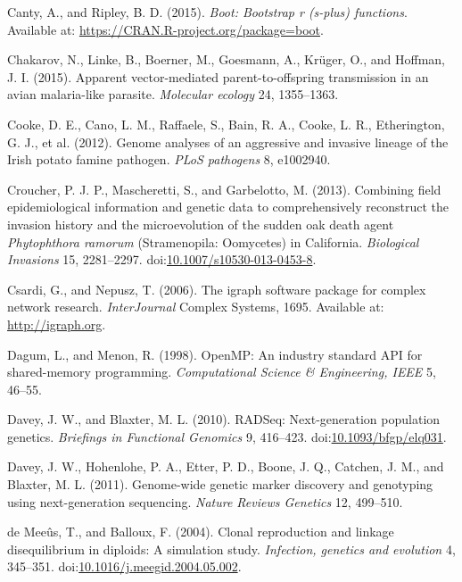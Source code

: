 \documentclass[double,12pt]{beavtex}
\begin{document}
  \hypertarget{ref-canty2015boot}{}
  Canty, A., and Ripley, B. D. (2015). \emph{Boot: Bootstrap r (s-plus)
  functions}. Available at: \url{https://CRAN.R-project.org/package=boot}.
  
  \hypertarget{ref-chakarov2015apparent}{}
  Chakarov, N., Linke, B., Boerner, M., Goesmann, A., Krüger, O., and
  Hoffman, J. I. (2015). Apparent vector-mediated parent-to-offspring
  transmission in an avian malaria-like parasite. \emph{Molecular ecology}
  24, 1355--1363.
  
  \hypertarget{ref-cooke2012genome}{}
  Cooke, D. E., Cano, L. M., Raffaele, S., Bain, R. A., Cooke, L. R.,
  Etherington, G. J., et al. (2012). Genome analyses of an aggressive and
  invasive lineage of the Irish potato famine pathogen. \emph{PLoS
  pathogens} 8, e1002940.
  
  \hypertarget{ref-croucher2013combining}{}
  Croucher, P. J. P., Mascheretti, S., and Garbelotto, M. (2013).
  Combining field epidemiological information and genetic data to
  comprehensively reconstruct the invasion history and the microevolution
  of the sudden oak death agent \emph{Phytophthora ramorum} (Stramenopila:
  Oomycetes) in California. \emph{Biological Invasions} 15, 2281--2297.
  doi:\href{https://doi.org/10.1007/s10530-013-0453-8}{10.1007/s10530-013-0453-8}.
  
  \hypertarget{ref-csardi2006igraph}{}
  Csardi, G., and Nepusz, T. (2006). The igraph software package for
  complex network research. \emph{InterJournal} Complex Systems, 1695.
  Available at: \url{http://igraph.org}.
  
  \hypertarget{ref-dagum1998openmp}{}
  Dagum, L., and Menon, R. (1998). OpenMP: An industry standard API for
  shared-memory programming. \emph{Computational Science \& Engineering,
  IEEE} 5, 46--55.
  
  \hypertarget{ref-davey2010rad}{}
  Davey, J. W., and Blaxter, M. L. (2010). RADSeq: Next-generation
  population genetics. \emph{Briefings in Functional Genomics} 9,
  416--423.
  doi:\href{https://doi.org/10.1093/bfgp/elq031}{10.1093/bfgp/elq031}.
  
  \hypertarget{ref-davey2011genome}{}
  Davey, J. W., Hohenlohe, P. A., Etter, P. D., Boone, J. Q., Catchen, J.
  M., and Blaxter, M. L. (2011). Genome-wide genetic marker discovery and
  genotyping using next-generation sequencing. \emph{Nature Reviews
  Genetics} 12, 499--510.
  
  \hypertarget{ref-de2004clonal}{}
  de Meeûs, T., and Balloux, F. (2004). Clonal reproduction and linkage
  disequilibrium in diploids: A simulation study. \emph{Infection,
  genetics and evolution} 4, 345--351.
  doi:\href{https://doi.org/10.1016/j.meegid.2004.05.002}{10.1016/j.meegid.2004.05.002}.
  
\end{document}
